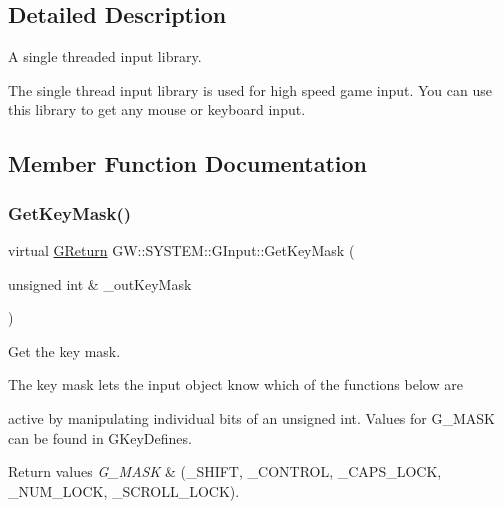 \subsection{Detailed Description}
A single threaded input library. 

The single thread input library is used for high speed game input. You can use this library to get any mouse or keyboard input. 

\subsection{Member Function Documentation}
\mbox{\label{classGW_1_1SYSTEM_1_1GInput_a448ee14346a393286b0dfe1dc61ca93d}} 
\subsubsection{\texorpdfstring{GetKeyMask()}{GetKeyMask()}}
{\footnotesize\ttfamily virtual \mbox{\hyperlink{namespaceGW_a67a839e3df7ea8a5c5686613a7a3de21}{G\+Return}} G\+W\+::\+S\+Y\+S\+T\+E\+M\+::\+G\+Input\+::\+Get\+Key\+Mask (\begin{DoxyParamCaption}\item[{unsigned int \&}]{\+\_\+out\+Key\+Mask }\end{DoxyParamCaption})\hspace{0.3cm}{\ttfamily [pure virtual]}}



Get the key mask. 

The key mask lets the input object know which of the functions below are

active by manipulating individual bits of an unsigned int. Values for G\+\_\+\+M\+A\+SK can be found in G\+Key\+Defines.


\begin{DoxyRetVals}{Return values}
{\em G\+\_\+\+M\+A\+SK} & (\+\_\+\+S\+H\+I\+FT, \+\_\+\+C\+O\+N\+T\+R\+OL, \+\_\+\+C\+A\+P\+S\+\_\+\+L\+O\+CK, \+\_\+\+N\+U\+M\+\_\+\+L\+O\+CK, \+\_\+\+S\+C\+R\+O\+L\+L\+\_\+\+L\+O\+CK). \\
\hline
\end{DoxyRetVals}
\mbox{\label{classGW_1_1SYSTEM_1_1GInput_a775fca7ad71371f369e3ad69fb32603a}} 
